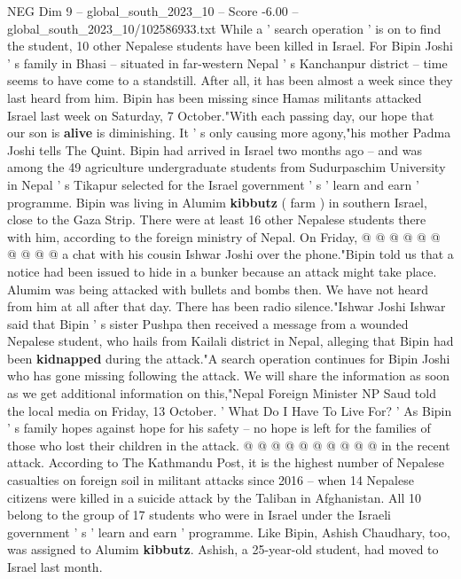 \begin{textsample}{NEG Dim 9 – global\_south\_2023\_10 – Score -6.00 – global\_south\_2023\_10/102586933.txt}  \label{ex:f9_neg_365}
While a ' search operation ' is on to find the student, 10 other Nepalese students have been killed in Israel.
For Bipin Joshi ' s family in Bhasi -- situated in far-western Nepal ' s Kanchanpur district -- time seems to have come to a standstill.
After all, it has been almost a week since they last heard from him.
Bipin has been missing since Hamas militants attacked Israel last week on Saturday, 7 October."With each passing day, our hope that our son is \textbf{alive} is diminishing.
It ' s only causing more agony,"his mother Padma Joshi tells The Quint.
Bipin had arrived in Israel two months ago -- and was among the 49 agriculture undergraduate students from Sudurpaschim University in Nepal ' s Tikapur selected for the Israel government ' s ' learn and earn ' programme.
Bipin was living in Alumim \textbf{kibbutz} ( farm ) in southern Israel, close to the Gaza Strip.
There were at least 16 other Nepalese students there with him, according to the foreign ministry of Nepal.
On Friday, @ @ @ @ @ @ @ @ @ @ a chat with his cousin Ishwar Joshi over the phone."Bipin told us that a notice had been issued to hide in a bunker because an attack might take place.
Alumim was being attacked with bullets and bombs then.
We have not heard from him at all after that day.
There has been radio silence."Ishwar Joshi Ishwar said that Bipin ' s sister Pushpa then received a message from a wounded Nepalese student, who hails from Kailali district in Nepal, alleging that Bipin had been \textbf{kidnapped} during the attack."A search operation continues for Bipin Joshi who has gone missing following the attack.
We will share the information as soon as we get additional information on this,"Nepal Foreign Minister NP Saud told the local media on Friday, 13 October. ' What Do I Have To Live For? ' As Bipin ' s family hopes against hope for his safety -- no hope is left for the families of those who lost their children in the attack. @ @ @ @ @ @ @ @ @ @ in the recent attack.
According to The Kathmandu Post, it is the highest number of Nepalese casualties on foreign soil in militant attacks since 2016 -- when 14 Nepalese citizens were killed in a suicide attack by the Taliban in Afghanistan.
All 10 belong to the group of 17 students who were in Israel under the Israeli government ' s ' learn and earn ' programme.
Like Bipin, Ashish Chaudhary, too, was assigned to Alumim \textbf{kibbutz}.
Ashish, a 25-year-old student, had moved to Israel last month.

\end{textsample}
